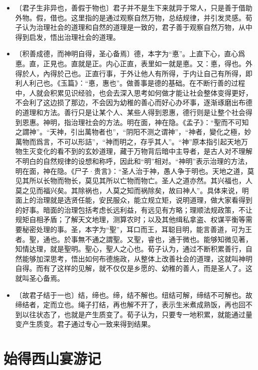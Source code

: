 \documentclass[12pt,UTF-8,openany,a4]{ctexbook}
\begin{document}
\begin{itemize}
    \setlength\itemsep{-0.2em}
    \item〔君子生非异也，善假于物也〕{\yiwen 君子并不是生下来就异于常人，只是善于借助外物。假，借也。这里指的是通过观察自然万物，总结规律，并引发灵感。荀子认为治理社会的道理和自然的道理是一致的，君子善于观察自然万物，从中得到启发，悟出治理社会的道理。}
    \item〔积善成德，而神明自得，圣心备焉〕{\yiwen 德，本字为“悳”。上直下心，直心爲悳。直，正見也。直就是正。内心正直，表里如一就是悳。又：悳，得也。外得於人，內得於己也。正直行事，于外让他人有所得，于内让自己有所得，即利人利己也。《玉篇》：“悳，惠也”。做善事是德的基础。在不断行善的过程中，人就会积累见识经验，也会去深入思考如何做才能让社会整体变得更好，不会利了这边损了那边，不会因为幼稚的善心而好心办坏事，逐渐琢磨出布德的道理和方法。善行只是让某个人、某些人得到恩惠，德行则是让整个社会得到恩惠。神明，指治理社会的方法。明在面，神在隐。《孟子》：“聖而不可知之謂神”。“天神，引出萬物者也”，“阴阳不测之谓神”，“神者，變化之極，妙萬物而爲言，不可以形詰”，“神而明之，存乎其人”。“神”原本指引起天地万物生灭变化的看不到的玄妙道理，藏于万物背后暗中主导者，是古人对不理解不明白的自然规律的设想和称呼，因此和“明”相对。“神明”表示治理的方法，明在面，神在隐。《尸子·贵言》：“圣人治于神，愚人争于明也。天地之道，莫见其所以长物而物长，莫见其所以亡物而物亡。圣人之道亦然。其兴福也，人莫之见而福兴矣。其除祸也，人莫之知而祸除矣，故曰神人”。具体来说，明面上的治理就是选贤任能，安民服众，能立规立矩，说明道理，做大家看得到的好事。暗面的治理包括考虑长远利益，有远见有方略；理顺法规政策，不让规矩自相矛盾；了解天文地理，测算农时；以及其他缉私拿盗、权谋平衡等需要秘密处理的事。圣，本字为“聖”，耳口而王，耳聪目明，能言善道，可为王者。聖，通也。於事無不通之謂聖。又聖，睿也，通于微也。能够知微见著，知情达理，就是聖明。聖心，聖人之心也。荀子认为，通过不断积累善行，自然能够加深思考，悟出如何布德施政，从整体上改善社会的道理，这就叫神明自得。而有了这样的见解，就不仅仅是乡愿的、幼稚的善人，而是圣人了。这就叫圣心备焉。}
    \item〔故君子结于一也〕{\yiwen 结，缔也。缔，结不解也。纽结可解，缔结不可解也。故缔结者，定而立也。绳子打结，再也解不开了，表示生米煮成熟饭，再也回不到以往状态了，也就是产生质变了。荀子认为，只要专一地积累，就能通过量变产生质变。君子通过专心一致来得到结果。}
\end{itemize}

\chapter{始得西山宴游记}
\end{document}
